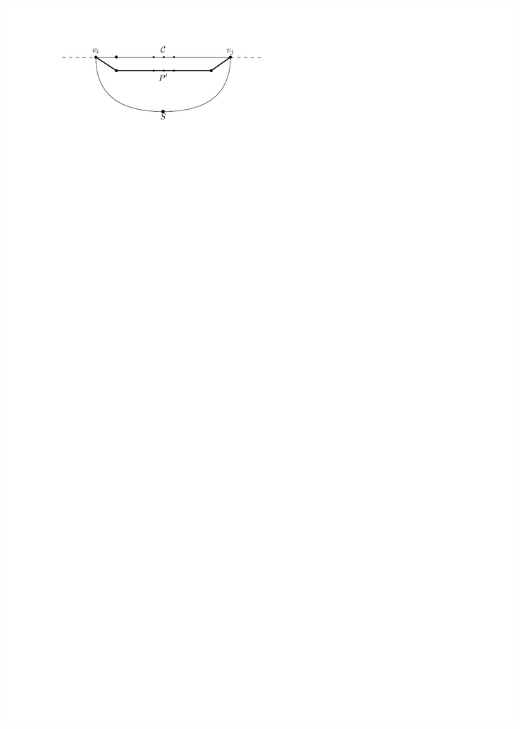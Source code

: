 \documentclass[a4paper]{article}
\begin{document}
\includegraphics[scale=1]{unifiedAlgo/img/sweep/cases/noIrregularity}
\clearpage%
\end{document}

